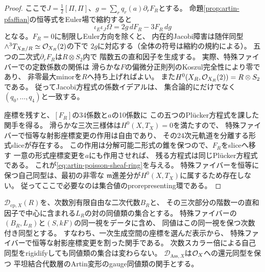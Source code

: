 \begin{proof}
ここで$J=\frac12[\Pi,\Pi]$、$g=\sum_rq_r(a)\partial_rF_R$とする。
命題\ref{prop:artin-pfaffian}の恒等式をEuler場で縮約すると
\begin{equation}\label{eq:artin-intrinsic-jacobi}
 \iota_E\iota_J\Omega
   =2g\,dF_R-3F_R\,dg
\end{equation}
となる。$F_R=0$に制限しEuler方向を除くと、
内在的Jacobi障害は随伴同型
$\wedge^3T_{X_R/R}\simeq\mathcal O_{X_R}(2)$の下で
$2g$に対応する（全体の符号は縮約の規約による）。
五つの二次式$\partial_rF_R$は$R\otimes S_2$内で
階数五の直和因子を生成する。
実際、特殊ファイバーでの定数係数の関係は
滑らかな$F$の偏微分正則列のKoszul完全性により零であり、
非零最大minorを$R$へ持ち上げればよい。
また$H^0(X_R,\mathcal O_{X_R}(2))=R\otimes S_2$である。
従ってJacobi方程式の係数イデアルは、
集合論的にだけでなく$(q_0,\ldots,q_4)$と一致する。

座標を残すと、$[F_R]$の34係数と$a$の10係数に
この五つのPl\"ucker方程式を課した関手を得る。
滑らかな三次三様体は$H^0(X,T_X)=0$を満たすので、
特殊ファイバーで恒等な射影座標変更の作用は自由であり、
その24次元軌道を分離する形式sliceが存在する。
この作用は分解可能二形式の錐を保つので、$F_R$をsliceへ移す
一意の形式座標変更を$a$にも作用させれば、
残る方程式は同じPl\"ucker方程式である。
これが\eqref{eq:artin-poisson-sheaf-ring}を与える。
特殊ファイバーを恒等に保つ自己同型は、最初の非零な
$\mathfrak m$進差分が$H^0(X,T_X)$に属するため存在しない。
従ってここで必要なのは集合値のprorepresenting環である。
\end{proof}

$\mathcal D_{\mathrm{cp},X}(R)$を、次数別有限自由な二次代数$B_R$と、
その三次部分の階数一の直和因子で中心に含まれる$L_R$の対の同値類の集合とする。
特殊ファイバーの$(B_R,L_R)$と$(S,kF)$の同一視をデータに含め、
同値はこの同一視を保つ次数付き同型とする。
すなわち、一次生成空間の座標を選んだ表示から、
特殊ファイバーで恒等な射影座標変更を割った関手である。
次数スカラー倍による自己同型をrigidifyしても同値類の集合は変わらない。
$\mathcal D_{\mathrm{Ass},X}$は$\mathcal O_X$への還元同型を保つ
平坦結合代数層のArtin変形のgauge同値類の関手とする。

